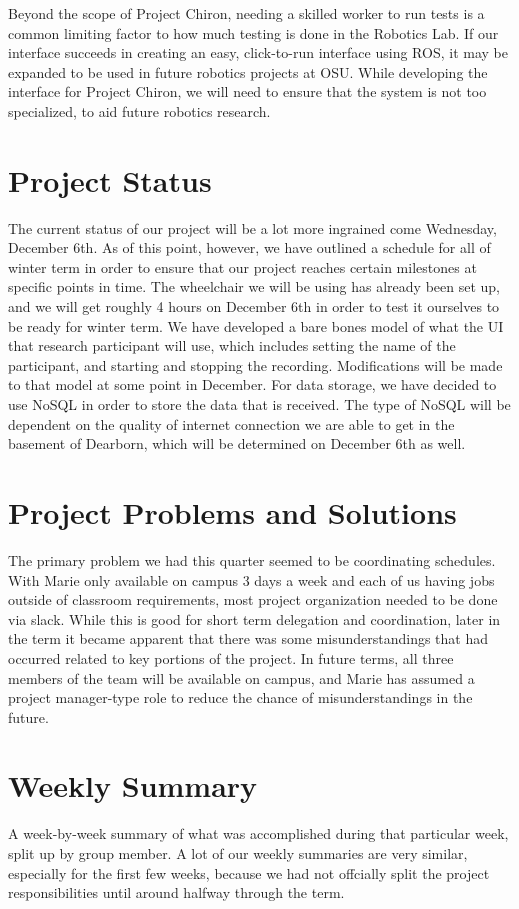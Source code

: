 \documentclass[onecolumn, draftclsnofoot,10pt, compsoc]{IEEEtran}
\begin{document}
Beyond the scope of Project Chiron, needing a skilled worker to run tests is a common limiting factor to how much testing is done in the Robotics Lab. If our interface succeeds in creating an easy, click-to-run interface using ROS, it may be expanded to be used in future robotics projects at OSU. While developing the interface for Project Chiron, we will need to ensure that the system is not too specialized, to aid future robotics research. 

\section{Project Status}
The current status of our project will be a lot more ingrained come Wednesday, December 6th. As of this point, however, we have outlined a schedule for all of winter term in order to ensure that our project reaches certain milestones at specific points in time. The wheelchair we will be using has already been set up, and we will get roughly 4 hours on December 6th in order to test it ourselves to be ready for winter term. We have developed a bare bones model of what the UI that research participant will use, which includes setting the name of the participant, and starting and stopping the recording. Modifications will be made to that model at some point in December. For data storage, we have decided to use NoSQL in order to store the data that is received. The type of NoSQL will be dependent on the quality of internet connection we are able to get in the basement of Dearborn, which will be determined on December 6th as well.

\section{Project Problems and Solutions}
The primary problem we had this quarter seemed to be coordinating schedules. With Marie only available on campus 3 days a week and each of us having jobs outside of classroom requirements, most project organization needed to be done via slack. While this is good for short term delegation and coordination, later in the term it became apparent that there was some misunderstandings that had occurred related to key portions of the project. In future terms, all three members of the team will be available on campus, and Marie has assumed a project manager-type role to reduce the chance of misunderstandings in the future. 

\section{Weekly Summary}
A week-by-week summary of what was accomplished during that particular week, split up by group member. A lot of our weekly summaries are very similar, especially for the first few weeks, because we had not offcially split the project responsibilities until around halfway through the term.
\end{document}
